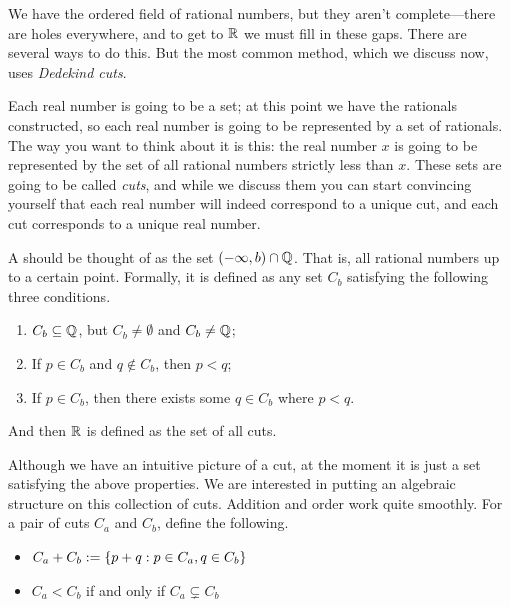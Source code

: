 \documentclass[11pt,twoside=off,numbers=noenddot]{scrbook}
\begin{document}
\begin{proofsketch}
    We have the ordered field of rational numbers, but they aren't complete—there are holes everywhere, and to get to $\mathbb R$ we must fill in these gaps. There are several ways to do this. But the most common method, which we discuss now, uses \textit{Dedekind cuts}.

    Each real number is going to be a set; at this point we have the rationals constructed, so each real number is going to be represented by a set of rationals. The way you want to think about it is this: the real number $x$ is going to be represented by the set of all rational numbers strictly less than $x$. These sets are going to be called \textit{cuts}, and while we discuss them you can start convincing yourself that each real number will indeed correspond to a unique cut, and each cut corresponds to a unique real number.

    \begin{definition}
        A  should be thought of as the set $(-\infty, b) \cap \mathbb Q$. That is, all rational numbers up to a certain point. Formally, it is defined as any set $C_b$ satisfying the following three conditions.
        \begin{enumerate}
            \item $C_b \subseteq \mathbb Q$, but $C_b \neq \emptyset$ and $C_b \neq \mathbb Q$;
            \item If $p \in C_b$ and $q \notin C_b$, then $p < q$;
            \item If $p \in C_b$, then there exists some $q \in C_b$ where $p < q$.
        \end{enumerate}
    \end{definition}

    And then $\mathbb R$ is defined as the set of all cuts.

    Although we have an intuitive picture of a cut, at the moment it is just a set satisfying the above properties. We are interested in putting an algebraic structure on this collection of cuts. Addition and order work quite smoothly. For a pair of cuts $C_a$ and $C_b$, define the following.
    \begin{itemize}
        \item $C_a + C_b := \{ p + q : p \in C_a, q \in C_b \}$
        \item $C_a < C_b$ if and only if $C_a \subsetneq C_b$
    \end{itemize}


\end{proofsketch}
\end{document}
